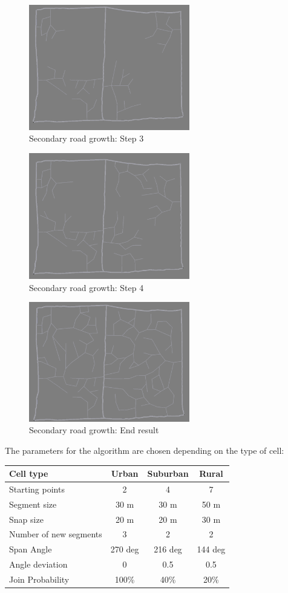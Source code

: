 \documentclass[a4paper,12pt]{scrartcl}
\begin{document}
\begin{figure}[h]
\center
\includegraphics[width=7cm]{s3.png}
\caption{Secondary road growth: Step 3}
\label{fig:sec3}
\end{figure}

\begin{figure}[h]
\center
\includegraphics[width=7cm]{s4.png}
\caption{Secondary road growth: Step 4}
\label{fig:sec4}
\end{figure}

\begin{figure}[h]
\center
\includegraphics[width=7cm]{sF.png}
\caption{Secondary road growth: End result}
\label{fig:secF}
\end{figure}

The parameters for the algorithm are chosen depending on the type of cell:

\begin{tabular}{l | c | c | c}
	\textbf{Cell type} & \textbf{Urban} & \textbf{Suburban} & \textbf{Rural} \\
	\hline 
	Starting points & 2 & 4 & 7 \\
	Segment size & 30 m & 30 m & 50 m \\
	Snap size & 20 m & 20 m & 30 m \\
	Number of new segments & 3 & 2 & 2 \\
	Span Angle & 270 deg & 216 deg & 144 deg \\
	Angle deviation & 0 & 0.5 & 0.5 \\
	Join Probability & 100\% & 40\% & 20\% \\
\end{tabular}
\end{document}
